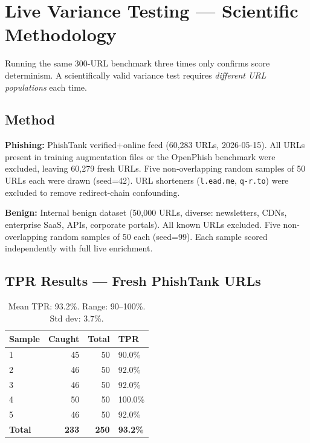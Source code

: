 \documentclass[11pt,a4paper]{article}
\newcommand{\code}[1]{\texttt{#1}}
\begin{document}
\section{Live Variance Testing --- Scientific Methodology}

Running the same 300-URL benchmark three times only confirms score
determinism. A scientifically valid variance test requires
\textit{different URL populations} each time.

\subsection*{Method}

\textbf{Phishing:} PhishTank verified+online feed (60,283 URLs,
2026-05-15). All URLs present in training augmentation files or the
OpenPhish benchmark were excluded, leaving 60,279 fresh URLs. Five
non-overlapping random samples of 50 URLs each were drawn (seed=42).
URL shorteners (\code{l.ead.me}, \code{q-r.to}) were excluded to
remove redirect-chain confounding.

\textbf{Benign:} Internal benign dataset (50,000 URLs, diverse:
newsletters, CDNs, enterprise SaaS, APIs, corporate portals). All
known URLs excluded. Five non-overlapping random samples of 50 each
(seed=99). Each sample scored independently with full live enrichment.

\subsection*{TPR Results --- Fresh PhishTank URLs}

\begin{table}[h]
\centering
\begin{tabular}{lrrl}
\toprule
Sample & Caught & Total & TPR \\
\midrule
1 & 45 & 50 & 90.0\% \\
2 & 46 & 50 & 92.0\% \\
3 & 46 & 50 & 92.0\% \\
4 & 50 & 50 & 100.0\% \\
5 & 46 & 50 & 92.0\% \\
\midrule
\textbf{Total} & \textbf{233} & \textbf{250}
  & \textbf{93.2\%} \\
\bottomrule
\end{tabular}
\caption{Mean TPR: 93.2\%. Range: 90--100\%. Std dev: 3.7\%.}
\end{table}
\end{document}
